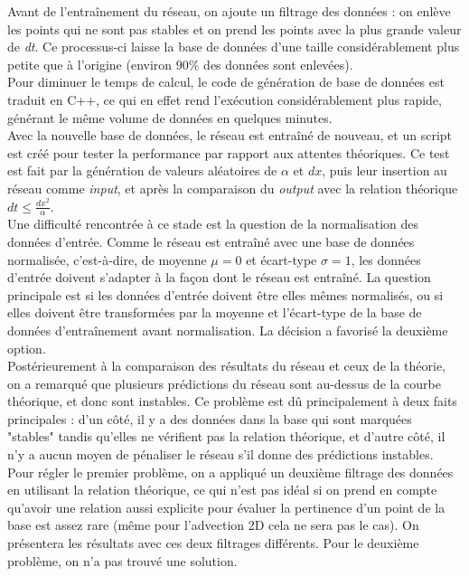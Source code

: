 \documentclass[a4paper,12pt,french]{article}
\begin{document}
Avant de l'entraînement du réseau, on ajoute un filtrage des données : on enlève les points qui ne sont pas stables et on prend les points avec la plus grande valeur de \textit{dt}. Ce processus-ci laisse la base de données d'une taille considérablement plus petite que à l'origine (environ $90\%$ des données sont enlevées).
\\

Pour diminuer le temps de calcul, le code de génération de base de données est traduit en C++, ce qui en effet rend l'exécution considérablement plus rapide, générant le même volume de données en quelques minutes.
\\

Avec la nouvelle base de données, le réseau est entraîné de nouveau, et un script est créé pour tester la performance par rapport aux attentes théoriques. Ce test est fait par la génération de valeurs aléatoires de $\alpha$ et $dx$, puis leur insertion au réseau comme \textit{input}, et après la comparaison du \textit{output} avec la relation théorique $dt\leq \frac{dx^2}{\alpha}$.
\\

Une difficulté rencontrée à ce stade est la question de la normalisation des données d'entrée. Comme le réseau est entraîné avec une base de données normalisée, c'est-à-dire, de moyenne $\mu=0$ et écart-type $\sigma=1$, les données d'entrée doivent s'adapter à la façon dont le réseau est entraîné. La question principale est si les données d'entrée doivent être elles mêmes normalisés, ou si elles doivent être transformées par la moyenne et l'écart-type de la base de données d'entraînement avant normalisation. La décision a favorisé la deuxième option.
\\

Postérieurement à la comparaison des résultats du réseau et ceux de la théorie, on a remarqué que plusieurs prédictions du réseau sont au-dessus de la courbe théorique, et donc sont instables. Ce problème est dû principalement à deux faits principales : d'un côté, il y a des données dans la base qui sont marquées "stables" tandis qu'elles ne vérifient pas la relation théorique, et d'autre côté, il n'y a aucun moyen de pénaliser le réseau s'il donne des prédictions instables.
\\

Pour régler le premier problème, on a appliqué un deuxième filtrage des données en utilisant la relation théorique, ce qui n'est pas idéal si on prend en compte qu'avoir une relation aussi explicite pour évaluer la pertinence d'un point de la base est assez rare (même pour l'advection 2D cela ne sera pas le cas). On présentera les résultats avec ces deux filtrages différents. Pour le deuxième problème, on n'a pas trouvé une solution.
\\
\end{document}
